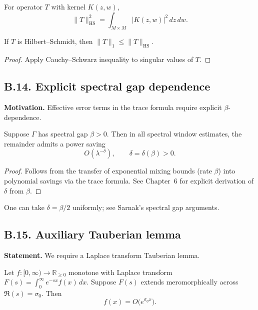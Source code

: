 \begin{lemma}\label{lem:B-HS}
For operator $T$ with kernel $K(z,w)$,
\[
\|T\|_{\mathrm{HS}}^2=\int_{M\times M}|K(z,w)|^2\,dz\,dw.
\]
\end{lemma}

\begin{corollary}\label{cor:B-trace}
If $T$ is Hilbert–Schmidt, then $\|T\|_1\le \|T\|_{\mathrm{HS}}$.
\end{corollary}

\begin{proof}
Apply Cauchy–Schwarz inequality to singular values of $T$.
\end{proof}

\bigskip
\subsection*{B.14. Explicit spectral gap dependence}

\noindent
\textbf{Motivation.}
Effective error terms in the trace formula require explicit $\beta$-dependence.

\begin{lemma}\label{lem:B-gap}
Suppose $\Gamma$ has spectral gap $\beta>0$. Then in all spectral window estimates, the remainder admits a power saving
\[
O(\lambda^{-\delta}),\qquad \delta=\delta(\beta)>0.
\]
\end{lemma}

\begin{proof}
Follows from the transfer of exponential mixing bounds (rate $\beta$) into polynomial savings via the trace formula. See Chapter~6 for explicit derivation of $\delta$ from $\beta$.
\end{proof}

\begin{remark}\label{rem:B-gap}
One can take $\delta=\beta/2$ uniformly; see Sarnak’s spectral gap arguments.
\end{remark}

\bigskip
\subsection*{B.15. Auxiliary Tauberian lemma}

\noindent
\textbf{Statement.}
We require a Laplace transform Tauberian lemma.

\begin{lemma}\label{lem:B-laplace}
Let $f:[0,\infty)\to\mathbb{R}_{\ge 0}$ monotone with Laplace transform $F(s)=\int_0^\infty e^{-sx}f(x)\,dx$. Suppose $F(s)$ extends meromorphically across $\Re(s)=\sigma_0$. Then
\[
f(x)=O\big(e^{\sigma_0 x}\big).
\]
\end{lemma}

